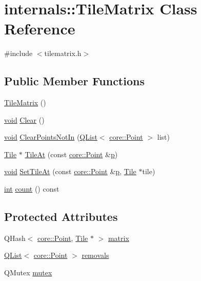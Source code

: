 \hypertarget{classinternals_1_1_tile_matrix}{\section{internals\-:\-:Tile\-Matrix Class Reference}
\label{classinternals_1_1_tile_matrix}
}


{\ttfamily \#include $<$tilematrix.\-h$>$}

\subsection*{Public Member Functions}
\begin{DoxyCompactItemize}
\item 
\hyperlink{group___o_p_map_widget_ga3d1378e5fe1bbfe4113a4ce68aea7859}{Tile\-Matrix} ()
\item 
\hyperlink{group___u_a_v_objects_plugin_ga444cf2ff3f0ecbe028adce838d373f5c}{void} \hyperlink{group___o_p_map_widget_ga77cb176c33480b11c18a63824649e839}{Clear} ()
\item 
\hyperlink{group___u_a_v_objects_plugin_ga444cf2ff3f0ecbe028adce838d373f5c}{void} \hyperlink{group___o_p_map_widget_ga6317ab91209c66759964ba340bd3b980}{Clear\-Points\-Not\-In} (\hyperlink{class_q_list}{Q\-List}$<$ \hyperlink{structcore_1_1_point}{core\-::\-Point} $>$ list)
\item 
\hyperlink{classinternals_1_1_tile}{Tile} $\ast$ \hyperlink{group___o_p_map_widget_gacf6a186610bc126a6fdd89149f0452e6}{Tile\-At} (const \hyperlink{structcore_1_1_point}{core\-::\-Point} \&\hyperlink{glext_8h_aa5367c14d90f462230c2611b81b41d23}{p})
\item 
\hyperlink{group___u_a_v_objects_plugin_ga444cf2ff3f0ecbe028adce838d373f5c}{void} \hyperlink{group___o_p_map_widget_gad2d5e21b31c1b3a0420990925a7e6cdc}{Set\-Tile\-At} (const \hyperlink{structcore_1_1_point}{core\-::\-Point} \&\hyperlink{glext_8h_aa5367c14d90f462230c2611b81b41d23}{p}, \hyperlink{classinternals_1_1_tile}{Tile} $\ast$tile)
\item 
\hyperlink{ioapi_8h_a787fa3cf048117ba7123753c1e74fcd6}{int} \hyperlink{group___o_p_map_widget_gad7ee58d6ccda306fff324d62676aab7a}{count} () const 
\end{DoxyCompactItemize}
\subsection*{Protected Attributes}
\begin{DoxyCompactItemize}
\item 
Q\-Hash$<$ \hyperlink{structcore_1_1_point}{core\-::\-Point}, \hyperlink{classinternals_1_1_tile}{Tile} $\ast$ $>$ \hyperlink{group___o_p_map_widget_gaecc6fdfe28242560867ab83c02820b20}{matrix}
\item 
\hyperlink{class_q_list}{Q\-List}$<$ \hyperlink{structcore_1_1_point}{core\-::\-Point} $>$ \hyperlink{group___o_p_map_widget_gaba9b5e3cf2e51b2a87c5a343968573e9}{removals}
\item 
Q\-Mutex \hyperlink{group___o_p_map_widget_gae5c51dfc2c2d290c958e335bef18f0a1}{mutex}
\end{DoxyCompactItemize}


